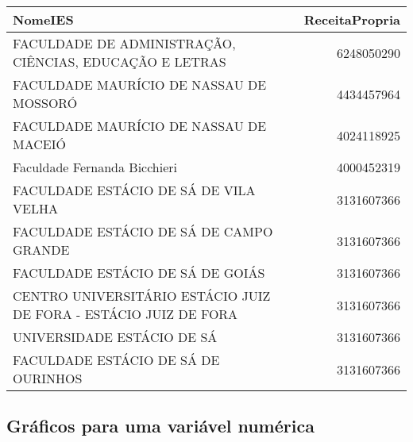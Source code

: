 \documentclass[11pt,]{style/krantz}
\makeatletter
\newenvironment{Shaded}{\begin{snugshade}}{\end{snugshade}}
\newcommand{\DataTypeTok}[1]{\textcolor[rgb]{0.13,0.29,0.53}{#1}}
\newcommand{\DecValTok}[1]{\textcolor[rgb]{0.00,0.00,0.81}{#1}}
\newcommand{\KeywordTok}[1]{\textcolor[rgb]{0.13,0.29,0.53}{\textbf{#1}}}
\newcommand{\NormalTok}[1]{#1}
\newcommand{\OperatorTok}[1]{\textcolor[rgb]{0.81,0.36,0.00}{\textbf{#1}}}
\newcommand{\OtherTok}[1]{\textcolor[rgb]{0.56,0.35,0.01}{#1}}
\newcommand{\StringTok}[1]{\textcolor[rgb]{0.31,0.60,0.02}{#1}}
\newenvironment{kframe}{%
\medskip{}
\setlength{\fboxsep}{.8em}
 \def\at@end@of@kframe{}%
 \ifinner\ifhmode%
  \def\at@end@of@kframe{\end{minipage}}%
  \begin{minipage}{\columnwidth}%
 \fi\fi%
 \def\FrameCommand##1{\hskip\@totalleftmargin \hskip-\fboxsep
 \colorbox{shadecolor}{##1}\hskip-\fboxsep
     \hskip-\linewidth \hskip-\@totalleftmargin \hskip\columnwidth}%
 \MakeFramed {\advance\hsize-\width
   \@totalleftmargin\z@ \linewidth\hsize
   \@setminipage}}%
 {\par\unskip\endMakeFramed%
 \at@end@of@kframe}
\renewenvironment{Shaded}{\begin{kframe}}{\end{kframe}}
\theoremstyle{definition}
\theoremstyle{definition}
\theoremstyle{definition}
\theoremstyle{remark}
\makeatother
\begin{document}
\begin{Shaded}
\end{Shaded}

\begin{table}[!h]
\centering
\begin{tabular}{lr}
\toprule
NomeIES & ReceitaPropria\\
\midrule
FACULDADE DE ADMINISTRAÇÃO, CIÊNCIAS, EDUCAÇÃO E LETRAS & 6248050290\\
FACULDADE MAURÍCIO DE NASSAU DE MOSSORÓ & 4434457964\\
FACULDADE MAURÍCIO DE NASSAU DE MACEIÓ & 4024118925\\
Faculdade Fernanda Bicchieri & 4000452319\\
FACULDADE ESTÁCIO DE SÁ DE VILA VELHA & 3131607366\\
\addlinespace
FACULDADE ESTÁCIO DE SÁ DE CAMPO GRANDE & 3131607366\\
FACULDADE ESTÁCIO DE SÁ DE GOIÁS & 3131607366\\
CENTRO UNIVERSITÁRIO ESTÁCIO JUIZ DE FORA - ESTÁCIO JUIZ DE FORA & 3131607366\\
UNIVERSIDADE ESTÁCIO DE SÁ & 3131607366\\
FACULDADE ESTÁCIO DE SÁ DE OURINHOS & 3131607366\\
\bottomrule
\end{tabular}
\end{table}

\hypertarget{graficos-para-uma-variavel-numerica}{%
\subsection{Gráficos para uma variável numérica}\label{graficos-para-uma-variavel-numerica}}
\end{document}

